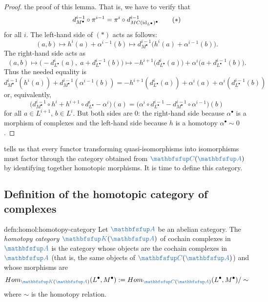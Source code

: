 \begin{proof}
  the proof of this lemma. That is, we have to verify that
  \[
    d^{i-1}_{M^\bullet} \circ \pi^{i-1} = \pi^i \circ
    d^{i-1}_{MC(\operatorname{id}_{L^\bullet})^\bullet} \tag{$*$}
  \]
  for all $i$. The left-hand side of $(*)$ acts as follows:
  \[
    (a, b) \mapsto h^i(a) + \alpha^{i-1}(b) \mapsto
    d^{i-1}_{M^\bullet}\bigl(h^i(a) + \alpha^{i-1}(b)\bigr).
  \]
  The right-hand side acts as
  \[
    (a, b) \mapsto \bigl(-d^i_{L^\bullet}(a),\; a +
    d^{i-1}_{L^\bullet}(b)\bigr) \mapsto
    -h^{i+1}\bigl(d^i_{L^\bullet}(a)\bigr) + \alpha^i\bigl(a +
    d^{i-1}_{L^\bullet}(b)\bigr).
  \]
  Thus the needed equality is
  \[
    d^{i-1}_{M^\bullet}(h^i(a)) + d^{i-1}_{M^\bullet}
    (\alpha^{i-1}(b)) = -h^{i+1}(d^i_{L^\bullet}(a)) + \alpha^i(a) +
    \alpha^i(d^{i-1}_{L^\bullet}(b))
  \]
  or, equivalently,
  \[
    \bigl(d^{i-1}_{M^\bullet} \circ h^i + h^{i+1} \circ
    d^i_{L^\bullet} - \alpha^i\bigr)(a) = \bigl(\alpha^i \circ
    d^{i-1}_{L^\bullet} - d^{i-1}_{M^\bullet} \circ
    \alpha^{i-1}\bigr)(b)
  \]
  for all $a \in L^{i+1}$, $b \in L^i$. But both sides are $0$: the
  right-hand side because $\alpha^\bullet$ is a morphism of complexes
  and the left-hand side because $h$ is a homotopy
  $\alpha^\bullet \sim 0$.
\end{proof}

 tells us that every functor transforming
quasi-isomorphisms into isomorphisms must factor through the category
obtained from $\categ{C}(\categ{A})$ by identifying together homotopic
morphisms. It is time to define this category.

\subsection{Definition of the homotopic category of complexes}
\label{subsec:homol:definition-of-the-homotopic-category-of-complexes}

\begin{defn}{}{defn:homol:homotopy-category}
  Let $\categ{A}$ be an abelian category. The \emph{homotopy category}
  $\categ{K}(\categ{A})$ of cochain complexes in $\categ{A}$ is the
  category whose objects are the cochain complexes in $\categ{A}$
  (that is, the same objects of $\categ{C}(\categ{A})$) and whose
  morphisms are
  \[
    \Hom_{\categ{K}(\categ{A})}(L^\bullet, M^\bullet) :=
    \Hom_{\categ{C}(\categ{A})}(L^\bullet, M^\bullet)/\sim
  \]
  where $\sim$ is the homotopy relation.
\end{defn}

